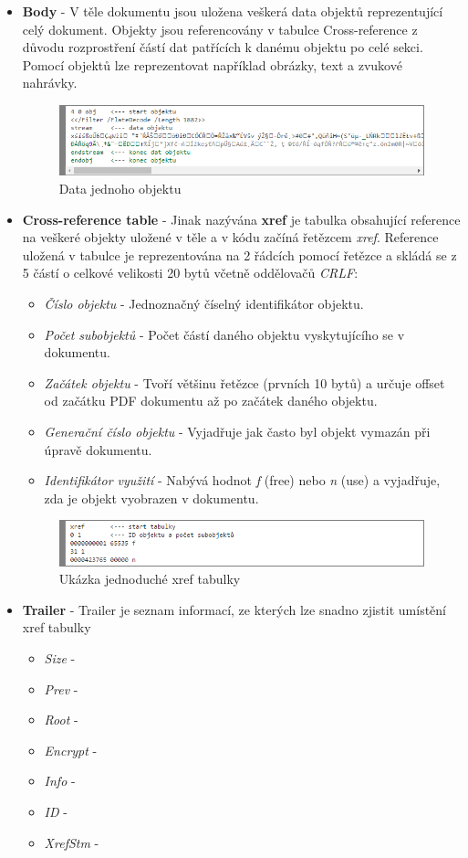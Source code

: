 \begin{itemize}
	\item \textbf{Body} - V těle dokumentu jsou uložena veškerá data objektů reprezentující celý dokument. Objekty jsou referencovány v tabulce Cross-reference z důvodu rozprostření částí dat patřících k danému objektu po celé sekci. Pomocí objektů lze reprezentovat například obrázky, text a zvukové nahrávky.
	\begin{figure}[h!]
	\centering
	\includegraphics[width=12cm]{img/pdf_body}
	\caption{Data jednoho objektu}
	\label{fig:pdf_body}
	\end{figure}
	\item \textbf{Cross-reference table} - Jinak nazývána \textbf{xref} je tabulka obsahující reference na veškeré objekty uložené v těle a v kódu začíná řetězcem \textit{xref}. Reference uložená v tabulce je reprezentována na 2 řádcích pomocí řetězce a skládá se z 5 částí o celkové velikosti 20 bytů včetně oddělovačů \textit{CRLF}:
	\begin{itemize}
		\item \textit{Číslo objektu} - Jednoznačný číselný identifikátor objektu.
		\item \textit{Počet subobjektů} - Počet částí daného objektu vyskytujícího se v dokumentu.
		\item \textit{Začátek objektu} - Tvoří většinu řetězce (prvních 10 bytů) a určuje offset od začátku PDF dokumentu až po začátek daného objektu.
		\item \textit{Generační číslo objektu} - Vyjadřuje jak často byl objekt vymazán při úpravě dokumentu. 
		\item \textit{Identifikátor využití} - Nabývá hodnot \textit{f} (free) nebo \textit{n} (use) a vyjadřuje, zda je objekt vyobrazen v dokumentu.
	\end{itemize}
	\newpage
	\begin{figure}[h!]
	\centering
	\includegraphics[width=12cm]{img/pdf_xref}
	\caption{Ukázka jednoduché xref tabulky}
	\label{fig:pdf_xref}
	\end{figure}
	\item \textbf{Trailer} -  Trailer je seznam informací, ze kterých lze snadno zjistit umístění xref tabulky
	\begin{itemize}
		\item \textit{Size} - 
		\item \textit{Prev} - 
		\item \textit{Root} -
		\item \textit{Encrypt} - 
		\item \textit{Info} - 
		\item \textit{ID} -
		\item \textit{XrefStm} - 


\end{itemize}
\end{itemize}
